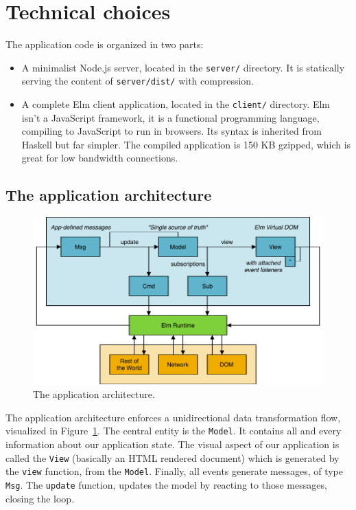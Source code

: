 


\section{Technical choices}

The application code is organized in two parts:

\begin{itemize}
\item A minimalist Node.js server, located in the \verb|server/| directory.
	It is statically serving the content of \verb|server/dist/|
    with compression.
\item A complete Elm client application, located in the \verb|client/| directory.
    Elm~\cite{czaplicki2013asynchronous,czaplicki2017elm}
    isn't a JavaScript framework, it is a functional programming language,
	compiling to JavaScript to run in browsers.
	Its syntax is inherited from Haskell but far simpler.
	The compiled application is 150 KB gzipped,
    which is great for low bandwidth connections.
\end{itemize}


\subsection{The application architecture}

\begin{figure}[ht]
\includegraphics[width=\columnwidth]{assets/img/tea-draw-io.pdf}
\caption{The application architecture.}%
\label{fig:tea}
\end{figure}

The application architecture enforces a unidirectional data transformation flow,
visualized in Figure~\ref{fig:tea}.
The central entity is the \verb|Model|.
It contains all and every information about our application state.
The visual aspect of our application is called the \verb|View|
(basically an HTML rendered document) which is generated by the \verb|view| function,
from the \verb|Model|. Finally, all events generate messages, of type \verb|Msg|.
The \verb|update| function, updates the model by reacting to those messages, closing the loop.

